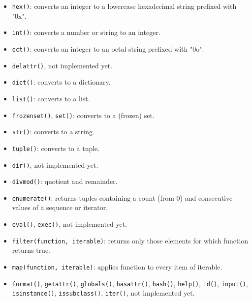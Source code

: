\begin{itemize}
\item \texttt{hex()}: converts an integer to a lowercase hexadecimal string prefixed with "0x".

\item \texttt{int()}: converts a number or string to an integer.

\item \texttt{oct()}: converts an integer to an octal string prefixed with "0o".

\item
\texttt{delattr()},
\dotfill not implemented yet.
%

\item \texttt{dict()}: converts to a dictionary.

\item \texttt{list()}: converts to a list.

\item \texttt{frozenset()}, \texttt{set()}: converts to a (frozen) set.

\item \texttt{str()}: converts to a string.

\item \texttt{tuple()}: converts to a tuple.
%

\item
\texttt{dir()},
\dotfill not implemented yet.

\item \texttt{divmod()}: quotient and remainder.

\item \texttt{enumerate()}: returns tuples containing a count (from 0) and consecutive values of a sequence or iterator.

\item
\texttt{eval()},
\texttt{exec()},
\dotfill not implemented yet.

\item \texttt{filter(function, iterable)}: returns only those elements for which function returns true.

\item \texttt{map(function, iterable)}: applies function to every item of iterable.

\item
\texttt{format()},
\texttt{getattr()},
\texttt{globals()},
\texttt{hasattr()},
\texttt{hash()},
\texttt{help()},
\texttt{id()},
\texttt{input()},
\texttt{isinstance()},
\texttt{issubclass()},
\texttt{iter()},
\dotfill not implemented yet.


\end{itemize}

